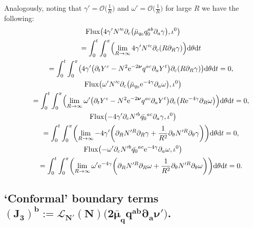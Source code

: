 \documentclass[pdftex]{sigma}
\def\ptl{\partial}%
\def\mbo#1{\boldsymbol{#1}}%
\numberwithin{equation}{section}
\begin{document}
Analogously, noting that $\gamma' = \mathcal{O}\bigl(\frac{1}{R}\bigr)$ and $\omega' = \mathcal{O} \bigl(\frac{1}{R}\bigr)$ for large $R$ we have the following:
\begin{gather*}
{\rm Flux} \bigl(4\gamma' N'^c\ptl_c \bigl(\bar{\mu}_{q_0} q^{ab}_0 \ptl_a \gamma\bigr), \iota^0\bigr) \\
\qquad{} = \int^t_0 \int^\pi_0 \Bigl(\lim_{R \to \infty} 4 \gamma' N'^c \ptl_c (R \ptl_R \gamma)\Bigr) {\rm d}\theta {\rm d}t \notag\\
\qquad{} = \int^t_0 \int^\pi_0 \bigl(4 \gamma' \bigl(\ptl_t Y^c - N^2 {\rm e}^{-2 \mbo{\nu}} q^{ac} \ptl_a Y^t\bigr) \ptl_c (R \ptl_R \gamma) \bigr) {\rm d}\theta {\rm d}t
=0,
\\
 {\rm Flux} \bigl(\omega' N'^c \ptl_c \bigl(\bar{\mu}_{q_0} {\rm e}^{-4\gamma} \ptl_a \omega\bigr), \iota^0\bigr) \notag\\
\qquad{} = \int^t_0 \int^\pi_0 \Bigl(\lim_{R \to \infty} \omega' \bigl(\ptl_t Y^c - N^2 {\rm e}^{-2 \mbo{\nu}} q^{ac} \ptl_a Y^t\bigr) \ptl_c \bigl(R {\rm e}^{-4\gamma} \ptl_R \omega\bigr)\Bigr) {\rm d}\theta {\rm d}t
 =0,
\\
 {\rm Flux} \bigl(-4\gamma' \ptl_c N'^b \bar{q_0}^{ac} \ptl_a \gamma, \iota^0\bigr) \notag\\
\qquad{} = \int^t_0 \int^\pi_0 \biggl(\lim_{R \to \infty} -4 \gamma' \biggl(\ptl_R N'^R \ptl_R \gamma + \frac{1}{R^2} \ptl_\theta N'^R \ptl_\theta \gamma \biggr)\biggr) {\rm d}\theta {\rm d}t
 = 0,
\\
 {\rm Flux} \bigl(-\omega' \ptl_c N'^b \bar{q_0}^{ac} {\rm e}^{-4\gamma} \ptl_a \omega, \iota^0\bigr) \notag\\
\qquad{} = \int^t_0 \int^\pi_0 \biggl(\lim_{R \to \infty} \omega' {\rm e}^{-4\gamma} \biggl(\ptl_R N'^R \ptl_R \omega + \frac{1}{R^2} \ptl_\theta N'^R \ptl_\theta \omega \biggr)\biggr) {\rm d}\theta {\rm d}t
 =0.
\end{gather*}

\subsection*{`Conformal' boundary terms $\boldsymbol{
(J_3)^b := \mathcal{L}_{N'} (N) \bigl(2 \bar{\mu}_q q^{ab} \ptl_a \mbo{\nu}'\bigr)}$.}
\end{document}
